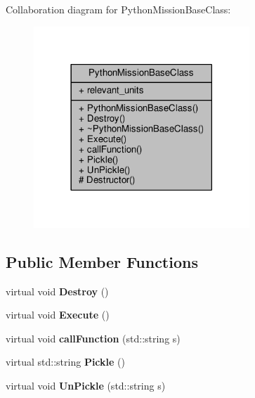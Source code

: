 Collaboration diagram for Python\+Mission\+Base\+Class\+:
\nopagebreak
\begin{figure}[H]
\begin{center}
\leavevmode
\includegraphics[width=230pt]{d9/dd7/classPythonMissionBaseClass__coll__graph}
\end{center}
\end{figure}
\subsection*{Public Member Functions}
\begin{DoxyCompactItemize}
\item 
virtual void {\bfseries Destroy} ()\hypertarget{classPythonMissionBaseClass_ab30c421995ff81563f791b5214252645}{}\label{classPythonMissionBaseClass_ab30c421995ff81563f791b5214252645}

\item 
virtual void {\bfseries Execute} ()\hypertarget{classPythonMissionBaseClass_a50cf0f68627b414e0476b5bdaf654b9f}{}\label{classPythonMissionBaseClass_a50cf0f68627b414e0476b5bdaf654b9f}

\item 
virtual void {\bfseries call\+Function} (std\+::string s)\hypertarget{classPythonMissionBaseClass_a3bfab28738a9eb165fe86dd3cf7a9a98}{}\label{classPythonMissionBaseClass_a3bfab28738a9eb165fe86dd3cf7a9a98}

\item 
virtual std\+::string {\bfseries Pickle} ()\hypertarget{classPythonMissionBaseClass_a6280fa7d25b8a9258d9769d6cf6c9740}{}\label{classPythonMissionBaseClass_a6280fa7d25b8a9258d9769d6cf6c9740}

\item 
virtual void {\bfseries Un\+Pickle} (std\+::string s)\hypertarget{classPythonMissionBaseClass_a291c1da34cd14fe4e7f5bc86a0fa0bf7}{}\label{classPythonMissionBaseClass_a291c1da34cd14fe4e7f5bc86a0fa0bf7}

\end{DoxyCompactItemize}
